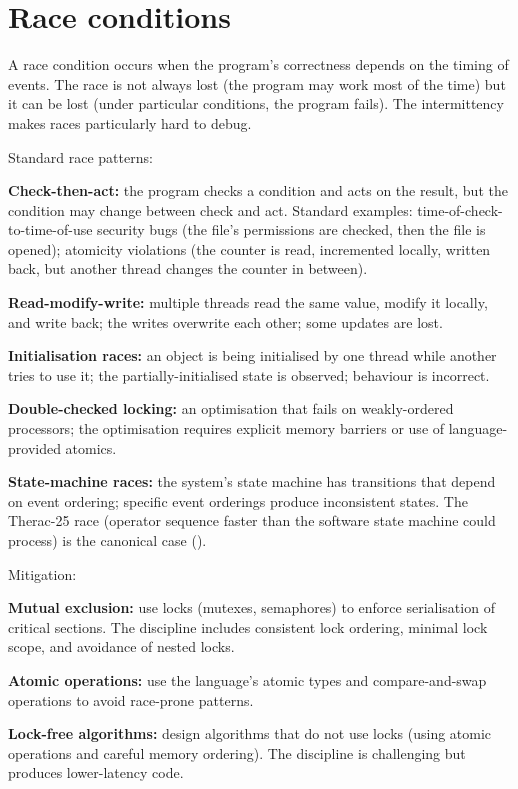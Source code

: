\section{Race conditions}

A race condition occurs when the program's correctness depends on the timing of events. The race is not always lost (the program may work most of the time) but it can be lost (under particular conditions, the program fails). The intermittency makes races particularly hard to debug.

Standard race patterns:

\textbf{Check-then-act:} the program checks a condition and acts on the result, but the condition may change between check and act. Standard examples: time-of-check-to-time-of-use security bugs (the file's permissions are checked, then the file is opened); atomicity violations (the counter is read, incremented locally, written back, but another thread changes the counter in between).

\textbf{Read-modify-write:} multiple threads read the same value, modify it locally, and write back; the writes overwrite each other; some updates are lost.

\textbf{Initialisation races:} an object is being initialised by one thread while another tries to use it; the partially-initialised state is observed; behaviour is incorrect.

\textbf{Double-checked locking:} an optimisation that fails on weakly-ordered processors; the optimisation requires explicit memory barriers or use of language-provided atomics.

\textbf{State-machine races:} the system's state machine has transitions that depend on event ordering; specific event orderings produce inconsistent states. The Therac-25 race (operator sequence faster than the software state machine could process) is the canonical case (\cite{paper:leveson-turner1993}).

Mitigation:

\textbf{Mutual exclusion:} use locks (mutexes, semaphores) to enforce serialisation of critical sections. The discipline includes consistent lock ordering, minimal lock scope, and avoidance of nested locks.

\textbf{Atomic operations:} use the language's atomic types and compare-and-swap operations to avoid race-prone patterns.

\textbf{Lock-free algorithms:} design algorithms that do not use locks (using atomic operations and careful memory ordering). The discipline is challenging but produces lower-latency code.

